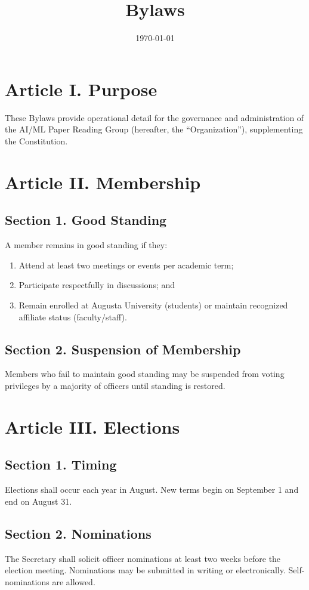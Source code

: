 \documentclass[12pt]{article}
\title{\orgname{}\\Bylaws}
\date{\today}
\newcommand{\orgname}{AI/ML Paper Reading Group}
\newcommand{\university}{Augusta University}
\newcommand{\electionmonth}{August}
\newcommand{\termbegin}{September 1}
\newcommand{\termend}{August 31}
\begin{document}
\maketitle
\thispagestyle{empty}

\newpage
\setcounter{page}{1}

\section*{Article I. Purpose}
These Bylaws provide operational detail for the governance and administration of the \orgname{} (hereafter, the ``Organization''), supplementing the Constitution.

\section*{Article II. Membership}
\subsection*{Section 1. Good Standing}
A member remains in good standing if they:
\begin{enumerate}[label=\alph*)]
    \item Attend at least two meetings or events per academic term;
    \item Participate respectfully in discussions; and
    \item Remain enrolled at \university{} (students) or maintain recognized affiliate status (faculty/staff).
\end{enumerate}

\subsection*{Section 2. Suspension of Membership}
Members who fail to maintain good standing may be suspended from voting privileges by a majority of officers until standing is restored.

\section*{Article III. Elections}
\subsection*{Section 1. Timing}
Elections shall occur each year in \electionmonth{}. New terms begin on \termbegin{} and end on \termend{}.

\subsection*{Section 2. Nominations}
The Secretary shall solicit officer nominations at least two weeks before the election meeting. Nominations may be submitted in writing or electronically. Self-nominations are allowed.
\end{document}
